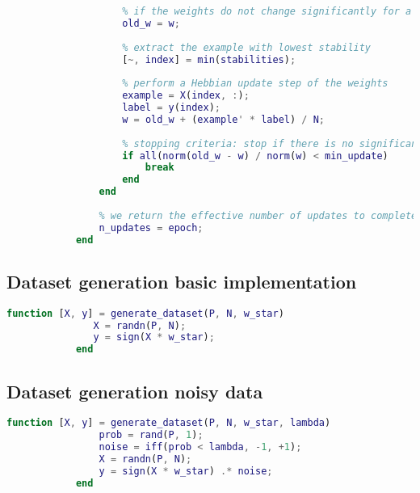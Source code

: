 \begin{appendices}
\begin{lstlisting}[language=Matlab]
                    % keep track of the old weight we use this to stop the training
                    % if the weights do not change significantly for a training step
                    old_w = w;
                    
                    % extract the example with lowest stability
                    [~, index] = min(stabilities);
                    
                    % perform a Hebbian update step of the weights
                    example = X(index, :);
                    label = y(index);
                    w = old_w + (example' * label) / N;
                    
                    % stopping criteria: stop if there is no significant update
                    if all(norm(old_w - w) / norm(w) < min_update)
                        break
                    end
                end
                
                % we return the effective number of updates to complete the training
                n_updates = epoch;
            end
        \end{lstlisting}

        \newpage
        \subsection{Dataset generation basic implementation}
        \begin{lstlisting}[language=Matlab]
            function [X, y] = generate_dataset(P, N, w_star)
               X = randn(P, N);
               y = sign(X * w_star);
            end
        \end{lstlisting}

        \subsection{Dataset generation noisy data}
        \begin{lstlisting}[language=Matlab,label={code:dataset_noise}]
            function [X, y] = generate_dataset(P, N, w_star, lambda)
                prob = rand(P, 1);
                noise = iff(prob < lambda, -1, +1);
                X = randn(P, N);
                y = sign(X * w_star) .* noise;
            end
        \end{lstlisting}

\end{appendices}
